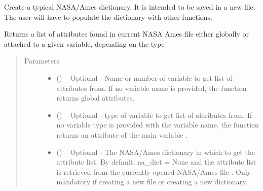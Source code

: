 \documentclass[a4paper,10pt,openany,english]{sphinxmanual}
\begin{document}
\begin{fulllineitems}
\begin{fulllineitems}
\begin{quote}
\begin{description}
\end{description}\end{quote}

\end{fulllineitems}


\begin{fulllineitems}
\label{egadsapi:egads.input.nasa_ames_io.NasaAmes.create_na_dict}
Create a typical NASA/Ames dictionary. It is intended to be saved in a new file. The user
will have to populate the dictionary with other functions.

\end{fulllineitems}


\begin{fulllineitems}
\label{egadsapi:egads.input.nasa_ames_io.NasaAmes.get_attribute_list}
Returns a list of attributes found in current NASA Ames file either globally or
attached to a given variable, depending on the type
\begin{quote}\begin{description}
\item[{Parameters}] \leavevmode\begin{itemize}
\item {} 
 () -- Optional - Name or number of variable to get list of attributes from. If no
variable name is provided, the function returns global attributes.

\item {} 
 () -- Optional - type of variable to get list of attributes from. If no variable 
type is provided with the variable name, the function returns an attribute
of the main variable .

\item {} 
 () -- Optional - The NASA/Ames dictionary in which to get the attribute list. By default, 
na\_dict = None and the attribute list is retrieved from the currently opened NASA/Ames 
file . Only mandatory if creating a new file or creating a new dictionary.


\end{itemize}
\end{description}
\end{quote}
\end{fulllineitems}
\end{fulllineitems}
\end{document}
